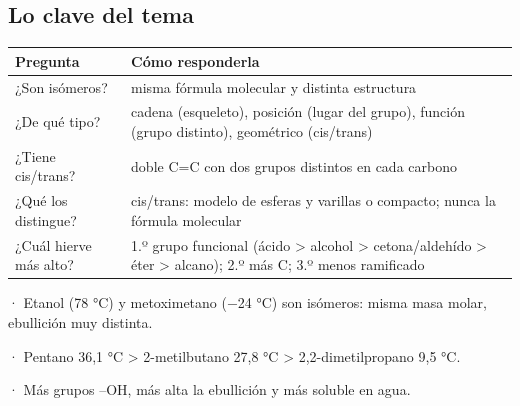\subsection{Lo clave del tema}
\begin{center}\small
\begin{tabularx}{\linewidth}{@{}>{\raggedright\arraybackslash\hsize=0.71\hsize}X>{\raggedright\arraybackslash\hsize=1.29\hsize}X@{}}
\toprule
\textbf{Pregunta} & \textbf{Cómo responderla} \\
\midrule
¿Son isómeros? & misma fórmula molecular y distinta estructura \\
¿De qué tipo? & cadena (esqueleto), posición (lugar del grupo), función (grupo distinto), geométrico (cis/trans) \\
¿Tiene cis/trans? & doble C=C con dos grupos distintos en cada carbono \\
¿Qué los distingue? & cis/trans: modelo de esferas y varillas o compacto; nunca la fórmula molecular \\
¿Cuál hierve más alto? & 1.º grupo funcional (ácido > alcohol > cetona/aldehído > éter > alcano); 2.º más C; 3.º menos ramificado \\
\bottomrule
\end{tabularx}
\end{center}
  
\begin{clave}[{Recuerda}] · Etanol (78 °C) y metoximetano (\ensuremath{-}24 °C) son isómeros: misma masa molar, ebullición muy distinta.\par · Pentano 36,1 °C > 2-metilbutano 27,8 °C > 2,2-dimetilpropano 9,5 °C.\par · Más grupos --OH, más alta la ebullición y más soluble en agua.\end{clave}
  

